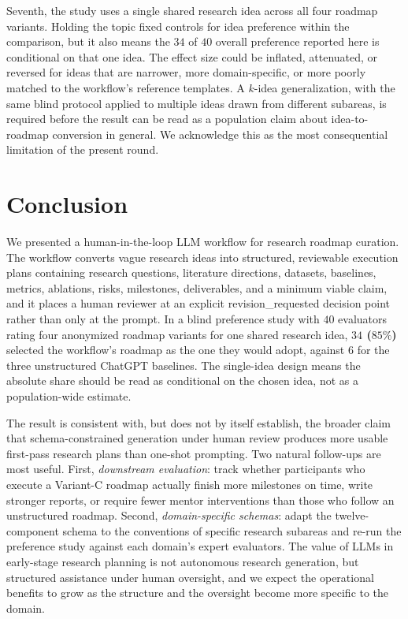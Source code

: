 \documentclass{article}
\begin{document}
Seventh, the study uses a single shared research idea across all four
roadmap variants. Holding the topic fixed controls for idea preference
within the comparison, but it also means the $34$ of $40$ overall
preference reported here is conditional on that one idea. The effect
size could be inflated, attenuated, or reversed for ideas that are
narrower, more domain-specific, or more poorly matched to the
workflow's reference templates. A $k$-idea generalization, with the
same blind protocol applied to multiple ideas drawn from different
subareas, is required before the result can be read as a population
claim about idea-to-roadmap conversion in general. We acknowledge this
as the most consequential limitation of the present round.


\section{Conclusion}
\label{sec:conclusion}

We presented a human-in-the-loop LLM workflow for research roadmap
curation. The workflow converts vague research ideas into structured,
reviewable execution plans containing research questions, literature
directions, datasets, baselines, metrics, ablations, risks, milestones,
deliverables, and a minimum viable claim, and it places a human
reviewer at an explicit \textsf{revision\_requested} decision point
rather than only at the prompt. In a blind preference study with $40$
evaluators rating four anonymized roadmap variants for one shared
research idea, \textbf{$34$ ($85\%$)} selected the workflow's roadmap
as the one they would adopt, against $6$ for the three unstructured
ChatGPT baselines. The single-idea design means the absolute share
should be read as conditional on the chosen idea, not as a
population-wide estimate.

The result is consistent with, but does not by itself establish, the
broader claim that schema-constrained generation under human review
produces more usable first-pass research plans than one-shot
prompting. Two natural follow-ups are most useful. First,
\emph{downstream evaluation}: track whether participants who execute a
Variant-C roadmap actually finish more milestones on time, write
stronger reports, or require fewer mentor interventions than those who
follow an unstructured roadmap. Second, \emph{domain-specific schemas}:
adapt the twelve-component schema to the conventions of specific
research subareas and re-run the preference study against each
domain's expert evaluators. The value of LLMs in early-stage research
planning is not autonomous research generation, but structured
assistance under human oversight, and we expect the operational
benefits to grow as the structure and the oversight become more
specific to the domain.

\FloatBarrier


\end{document}
